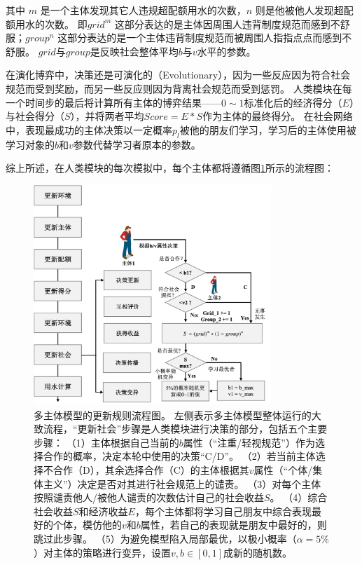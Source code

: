 其中 $m$ 是一个主体发现其它人违规超配额用水的次数，$n$ 则是他被他人发现超配额用水的次数。
即$grid^m$ 这部分表达的是主体因周围人违背制度规范而感到不舒服；$group^n$ 这部分表达的是一个主体违背制度规范而被周围人指指点点而感到不舒服。
$grid$与$group$是反映社会整体平均$b$与$v$水平的参数。

在演化博弈中，决策还是可演化的（Evolutionary），因为一些反应因为符合社会规范而受到奖励，而另一些反应则因为背离社会规范而受到惩罚。
人类模块在每一个时间步的最后将计算所有主体的博弈结果——$0 \sim 1$标准化后的经济得分（$E$）与社会得分（$S$），并将两者平均$Score = E * S$作为主体的最终得分。
在社会网络中，表现最成功的主体决策以一定概率$p_{l}$被他的朋友们学习，学习后的主体使用被学习对象的$b$和$v$参数代替学习者原本的参数。

综上所述，在人类模块的每次模拟中，每个主体都将遵循图\ref{ch6:fig:society}所示的流程图：

\begin{figure}[htb]
    \centering
    \includegraphics[width=0.8\textwidth]{img/ch6/ch6_updates_diagram.png}
    \caption[多主体模型的更新规则流程图]{多主体模型的更新规则流程图。
        左侧表示多主体模型整体运行的大致流程，“更新社会”步骤是人类模块进行决策的部分，包括五个主要步骤：
        （1）主体根据自己当前的$b$属性（“注重/轻视规范”）作为选择合作的概率，决定本轮中使用的决策“C/D”。
        （2）若当前主体选择不合作（D），其余选择合作（C）的主体根据其$v$属性（“个体/集体主义”）决定是否对其进行社会规范上的谴责。
        （3）对每个主体按照谴责他人/被他人谴责的次数估计自己的社会收益$S$。
        （4）综合社会收益$S$和经济收益$E$，每个主体都将学习自己朋友中综合表现最好的个体，模仿他的$v$和$b$属性，若自己的表现就是朋友中最好的，则跳过此步骤。
        （5）为避免模型陷入局部最优，以极小概率（$\alpha = 5\%$）对主体的策略进行变异，设置$v, b \in [0, 1]$成新的随机数。
    }\label{ch6:fig:society}
\end{figure}

